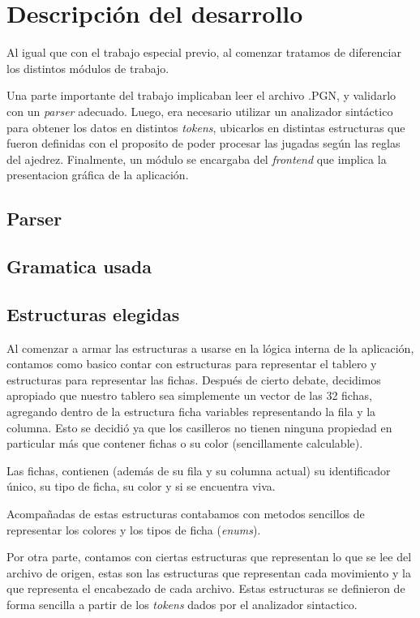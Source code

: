 \documentclass[a4paper,10pt]{article}
\begin{document}
\newpage

\section{Descripción del desarrollo}
    Al igual que con el trabajo especial previo, al comenzar tratamos de diferenciar los distintos módulos de trabajo. 

 Una parte importante del trabajo implicaban leer el archivo .PGN, y validarlo con un \textit{parser} adecuado.
Luego, era necesario utilizar un analizador sintáctico para obtener los datos en distintos \textit{tokens}, ubicarlos en distintas
estructuras que fueron definidas con el proposito de poder procesar las jugadas según las reglas del ajedrez.
Finalmente, un módulo se encargaba del \textit{frontend} que implica la presentacion gráfica de la aplicación.

\subsection{Parser}

\subsection{Gramatica usada}

\subsection{Estructuras elegidas}

Al comenzar a armar las estructuras a usarse en la lógica interna de la aplicación, contamos como basico contar con estructuras
para representar el tablero y estructuras para representar las fichas. Después de cierto debate, decidimos apropiado que nuestro
tablero sea simplemente un vector de las 32 fichas, agregando dentro de la estructura ficha variables representando la fila y la 
columna. Esto se decidió ya que los casilleros no tienen ninguna propiedad en particular más que contener fichas o su color 
(sencillamente calculable).

Las fichas, contienen (además de su fila y su columna actual) su identificador único, su tipo de ficha, su color y si se encuentra 
viva.

Acompañadas de estas estructuras contabamos con metodos sencillos de representar los colores y los tipos de ficha (\textit{enums}).

Por otra parte, contamos con ciertas estructuras que representan lo que se lee del archivo de origen, estas son las estructuras que 
representan cada movimiento y la que representa el encabezado de cada archivo. Estas estructuras se definieron de forma sencilla a 
partir de los \textit{tokens} dados por el analizador sintactico.
\end{document}
